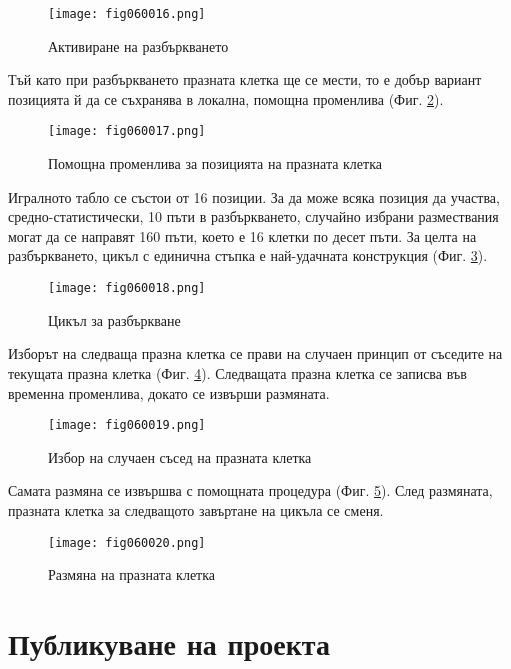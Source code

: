 \begin{figure}[H]
  \centering
  \texttt{[image: fig060016.png]}
  \caption{Активиране на разбъркването}
\label{fig060016}
\end{figure}

Тъй като при разбъркването празната клетка ще се мести, то е добър вариант позицията й да се съхранява в локална, помощна променлива (Фиг. \ref{fig060017}).

\begin{figure}[H]
  \centering
  \texttt{[image: fig060017.png]}
  \caption{Помощна променлива за позицията на празната клетка}
\label{fig060017}
\end{figure}

Игралното табло се състои от 16 позиции. За да може всяка позиция да участва, средно-статистически, 10 пъти в разбъркването, случайно избрани размествания могат да се направят 160 пъти, което е 16 клетки по десет пъти. За целта на разбъркването, цикъл с единична стъпка е най-удачната конструкция (Фиг. \ref{fig060018}).

\begin{figure}[H]
  \centering
  \texttt{[image: fig060018.png]}
  \caption{Цикъл за разбъркване}
\label{fig060018}
\end{figure}

Изборът на следваща празна клетка се прави на случаен принцип от съседите на текущата празна клетка  (Фиг. \ref{fig060019}). Следващата празна клетка се записва във временна променлива, докато се извърши размяната.

\begin{figure}[H]
  \centering
  \texttt{[image: fig060019.png]}
  \caption{Избор на случаен съсед на празната клетка}
\label{fig060019}
\end{figure}

Самата размяна се извършва с помощната процедура (Фиг. \ref{fig060020}). След размяната, празната клетка за следващото завъртане на цикъла се сменя.

\begin{figure}[H]
  \centering
  \texttt{[image: fig060020.png]}
  \caption{Размяна на празната клетка}
\label{fig060020}
\end{figure}

\section{Публикуване на проекта}

